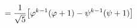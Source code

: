 \documentclass[preview]{standalone}
\begin{document}
\begin{align*}
\special{dvisvgm:raw <g id='unique000'>}= \frac{1}{\sqrt{5}}\big[\varphi^{k-1}(\varphi + 1)- \psi^{k-1}(\psi + 1)\big]\special{dvisvgm:raw </g>}
\end{align*}
\end{document}
